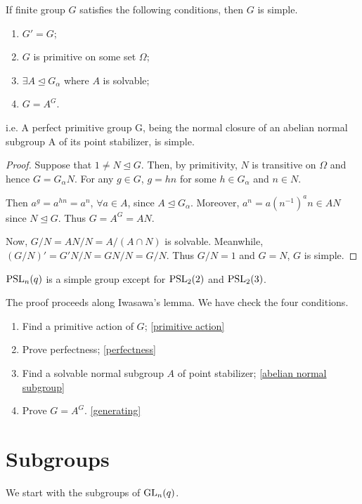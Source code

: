 \documentclass[a4paper,11pt]{article}
\def\subtitle#1{\section{#1}}
\begin{document}
\begin{lemma}[Iwasawa]
    If finite group $G$ satisfies the following conditions, then $G$ is simple.
    \begin{enumerate}[itemsep=0pt,label=\roman*.]
        \item $G'=G$;
        \item $G$ is primitive on some set $\Omega$;
        \item $\exists A\trianglelefteq G_\alpha$ where $A$ is solvable;
        \item $G=A^G$.
    \end{enumerate}
    i.e. A perfect primitive group G, being the normal
    closure of an abelian normal subgroup A of its point stabilizer, is simple.
\end{lemma}
\begin{proof}
    Suppose that $1\neq N\trianglelefteq G$. Then, by primitivity, $N$ is transitive on $\Omega$ and hence $G=G_\alpha N$. For any $g\in G$, $g=hn$ for some $h\in G_\alpha$ and $n\in N$. 
    
    Then $a^g=a^{hn}=a^n$, $\forall a\in A$, since $A\trianglelefteq G_\alpha$. Moreover, $a^n=a(n^{-1})^{a}n\in AN$ since $N\trianglelefteq G$. Thus $G=A^G= AN$.
    
    Now, $G/N=AN/N=A/(A\cap N)$ is solvable. Meanwhile, $(G/N)'=G'N/N=GN/N=G/N$. Thus $G/N=1$ and $G=N$, $G$ is simple.
\end{proof}

\begin{theorem}
    $\mathrm{PSL}_n(q)$ is a simple group except for $\mathrm{PSL}_2(2)$ and $\mathrm{PSL}_2(3)$.
\end{theorem}

The proof proceeds along Iwasawa's lemma. We have check the four conditions.
\begin{enumerate}[itemsep=0pt,label=\roman*.]
    \item Find a primitive action of $G$; \ref{primitive action}
    \item Prove perfectness; \ref{perfectness}
    \item Find a solvable normal subgroup $A$ of point stabilizer; \ref{abelian normal subgroup}
    \item Prove $G=A^G$. \ref{generating}
\end{enumerate}




\subtitle{Subgroups}

We start with the subgroups of $\mathrm{GL}_n(q)$.
\end{document}
